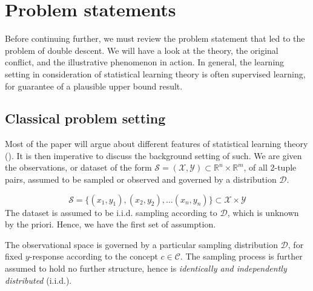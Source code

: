 \documentclass[10pt]{article} %
\begin{document}
\section{Problem statements}

Before continuing further, we must review the problem statement that led to the problem of double descent. We will have a look at the theory, the original conflict, and the illustrative phenomenon in action. In general, the learning setting in consideration of statistical learning theory is often supervised learning, for guarantee of a plausible upper bound result. 

\subsection{Classical problem setting}

Most of the paper will argue about different features of statistical learning theory (\cite{Sterkenburg_2024,Vapnik1999-VAPTNO,STL_Hajek_Maxim_2021}). It is then imperative to discuss the background setting of such. We are given the observations, or dataset of the form $\mathcal{S}=(\mathcal{X},\mathcal{Y})\subset \mathbb{R}^{n}\times \mathbb{R}^{m}$, of all 2-tuple pairs, assumed to be sampled or observed and governed by a distribution $\mathcal{D}$. 

\begin{equation*}
    \mathcal{S} = \{ (x_1,y_1), (x_2, y_2),\dots(x_n,y_n) \} \subset \mathcal{X}\times \mathcal{Y}
\end{equation*}
The dataset is assumed to be i.i.d. sampling according to $\mathcal{D}$, which is unknown by the priori. Hence, we have the first set of assumption. 
\begin{assumption}
The observational space is governed by a particular sampling distribution $\mathcal{D}$, for fixed $y$-response according to the concept $c\in \mathcal{C}$. The sampling process is further assumed to hold no further structure, hence is \textit{identically and independently distributed} (i.i.d.). 
\end{assumption}
\vspace{2mm}
\end{document}
